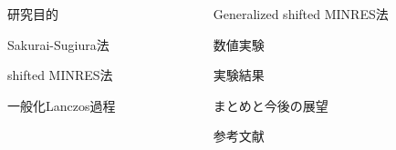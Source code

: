 \documentclass[final, dvipdfmx]{beamer}
\begin{document}
\begin{frame}[t]{}
	
	\begin{columns}[T]
	\begin{column}{.49\linewidth}
		\begin{block}{研究目的}
			
		\end{block}
		\begin{block}{Sakurai-Sugiura法}
			
		\end{block}
		\begin{block}{shifted MINRES法}
			
		\end{block}
		\begin{block}{一般化Lanczos過程}
			
		\end{block}
	\end{column}
	\hspace{0.0\columnwidth}
	\begin{column}{.49\linewidth}
		\begin{block}{Generalized shifted MINRES法}
			
		\end{block}
		\begin{block}{数値実験}
			
		\end{block}
		\begin{block}{実験結果}
			
		\end{block}
		\begin{block}{まとめと今後の展望}
			
		\end{block}
		\begin{block}{参考文献}
			
		\end{block}
	\end{column}
	\end{columns}
\end{frame}
\end{document}
